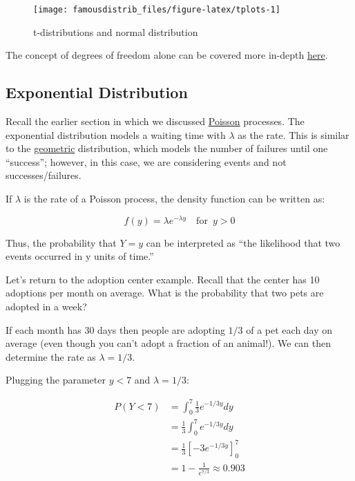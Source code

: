 \documentclass[
]{article}
\begin{document}
\begin{figure}

{\centering \texttt{[image: famousdistrib\_files/figure-latex/tplots-1]} 

}

\caption{t-distributions and normal distribution}\label{fig:tplots}
\end{figure}

The concept of degrees of freedom alone can be covered more in-depth \href{https://www.google.com/url?sa=t\&rct=j\&q=\&esrc=s\&source=web\&cd=\&ved=2ahUKEwj6guTEn9zxAhWSFlkFHbpRDrcQFjAJegQIAxAD\&url=http\%3A\%2F\%2Fweb.pdx.edu\%2F~stipakb\%2Fdownload\%2FPA551\%2FDegreesOfFreedom.pdf\&usg=AOvVaw31ywhyELwYqUyDvu85-19L}{here}.

\hypertarget{Exponential}{%
\subsection{Exponential Distribution}\label{Exponential}}

Recall the earlier section in which we discussed \protect\hyperlink{Poisson}{Poisson} processes. The exponential distribution models a waiting time with \(\lambda\) as the rate. This is similar to the \protect\hyperlink{ux5cux2520geometric}{geometric} distribution, which models the number of failures until one ``success''; however, in this case, we are considering events and not successes/failures.

If \(\lambda\) is the rate of a Poisson process, the density function can be written as:

\[f(y)=\lambda e^{-\lambda y} \quad \textrm{for} \enspace y>0\]

Thus, the probability that \(Y=y\) can be interpreted as ``the likelihood that two events occurred in y units of time.''

Let's return to the adoption center example. Recall that the center has 10 adoptions per month on average. What is the probability that two pets are adopted in a week?

If each month has 30 days then people are adopting \(1/3\) of a pet each day on average (even though you can't adopt a fraction of an animal!). We can then determine the rate as \(\lambda=1/3\).

Plugging the parameter \(y<7\) and \(\lambda=1/3\):

\[\begin{split}
P(Y < 7) &= \int_{0}^{7} \frac{1}{3} e^{-1/3y}dy \\ &= \frac{1}{3} \int_{0}^{7} e^{-1/3y}dy \\ &= \frac{1}{3} [-3e^{-1/3y}]^{7}_{0} \\ &= 1-\frac{1}{e^{7/3}} \approx 0.903
\end{split}\]
\end{document}
